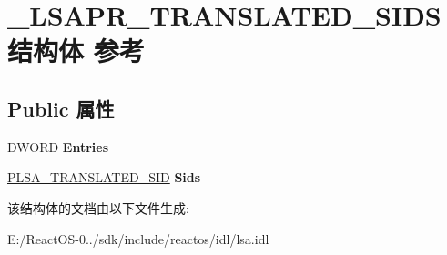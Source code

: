 \hypertarget{struct___l_s_a_p_r___t_r_a_n_s_l_a_t_e_d___s_i_d_s}{}\section{\+\_\+\+L\+S\+A\+P\+R\+\_\+\+T\+R\+A\+N\+S\+L\+A\+T\+E\+D\+\_\+\+S\+I\+D\+S结构体 参考}
\label{struct___l_s_a_p_r___t_r_a_n_s_l_a_t_e_d___s_i_d_s}
\subsection*{Public 属性}
\begin{DoxyCompactItemize}
\item 
\mbox{\label{struct___l_s_a_p_r___t_r_a_n_s_l_a_t_e_d___s_i_d_s_ad071b5318de5d90b44b88907bcb888aa}} 
D\+W\+O\+RD {\bfseries Entries}
\item 
\mbox{\label{struct___l_s_a_p_r___t_r_a_n_s_l_a_t_e_d___s_i_d_s_ad59ed16772483a5a8892e23c26d48b7c}} 
\hyperlink{struct___l_s_a___t_r_a_n_s_l_a_t_e_d___s_i_d}{P\+L\+S\+A\+\_\+\+T\+R\+A\+N\+S\+L\+A\+T\+E\+D\+\_\+\+S\+ID} {\bfseries Sids}
\end{DoxyCompactItemize}


该结构体的文档由以下文件生成\+:\begin{DoxyCompactItemize}
\item 
E\+:/\+React\+O\+S-\/0../sdk/include/reactos/idl/lsa.\+idl\end{DoxyCompactItemize}
